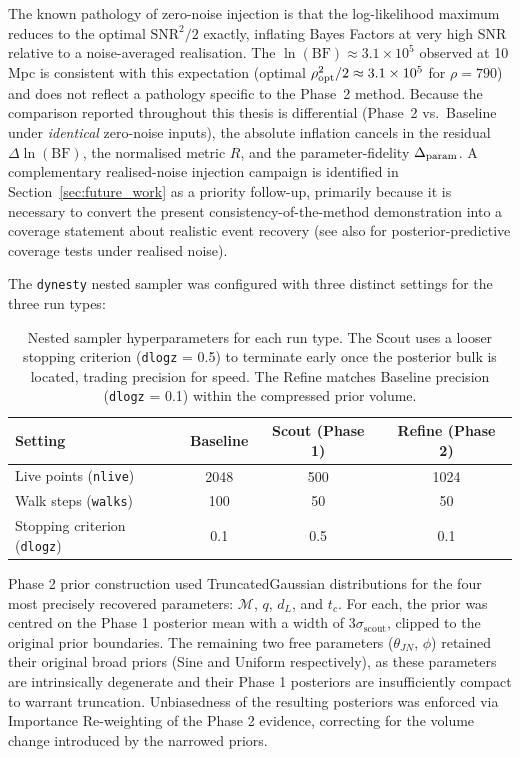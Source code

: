 \documentclass[12pt]{article}
\begin{document}
The known pathology of zero-noise injection is that the log-likelihood maximum reduces to the optimal $\mathrm{SNR}^2/2$ exactly, inflating Bayes Factors at very high SNR relative to a noise-averaged realisation. The $\ln(\mathrm{BF}) \approx 3.1\times 10^{5}$ observed at 10\,Mpc is consistent with this expectation (optimal $\rho_{\rm opt}^2/2 \approx 3.1\times 10^{5}$ for $\rho = 790$) and does not reflect a pathology specific to the Phase~2 method. Because the comparison reported throughout this thesis is differential (Phase~2 vs.\ Baseline under \emph{identical} zero-noise inputs), the absolute inflation cancels in the residual $\Delta \ln(\mathrm{BF})$, the normalised metric $R$, and the parameter-fidelity $\Delta_{\rm param}$. A complementary realised-noise injection campaign is identified in Section~\ref{sec:future_work} as a priority follow-up, primarily because it is necessary to convert the present consistency-of-the-method demonstration into a coverage statement about realistic event recovery (see also \cite{Cook2006} for posterior-predictive coverage tests under realised noise).

The \texttt{dynesty} nested sampler \cite{Romero-Shaw2020} was configured with three distinct settings for the three run types:

\begin{table}[htbp]
\centering
\begin{tabular}{l c c c}
\hline\hline
\textbf{Setting} & \textbf{Baseline} & \textbf{Scout (Phase 1)} & \textbf{Refine (Phase 2)} \\
\hline
Live points (\texttt{nlive})     & 2048 & 500  & 1024 \\
Walk steps (\texttt{walks})      & 100  & 50   & 50   \\
Stopping criterion (\texttt{dlogz}) & 0.1 & 0.5 & 0.1  \\
\hline\hline
\end{tabular}
\caption[Nested sampler hyperparameters (Scout / Refine / Baseline).]{Nested sampler hyperparameters for each run type. The Scout uses a looser stopping criterion (\texttt{dlogz} = 0.5) to terminate early once the posterior bulk is located, trading precision for speed. The Refine matches Baseline precision (\texttt{dlogz} = 0.1) within the compressed prior volume.}
\label{tab:sampler_settings}
\end{table}

Phase 2 prior construction used TruncatedGaussian distributions for the four most precisely recovered parameters: $\mathcal{M}$, $q$, $d_L$, and $t_c$. For each, the prior was centred on the Phase 1 posterior mean with a width of $3\sigma_{\mathrm{scout}}$, clipped to the original prior boundaries. The remaining two free parameters ($\theta_{JN}$, $\phi$) retained their original broad priors (Sine and Uniform respectively), as these parameters are intrinsically degenerate and their Phase 1 posteriors are insufficiently compact to warrant truncation. Unbiasedness of the resulting posteriors was enforced via Importance Re-weighting of the Phase 2 evidence, correcting for the volume change introduced by the narrowed priors.
\end{document}
